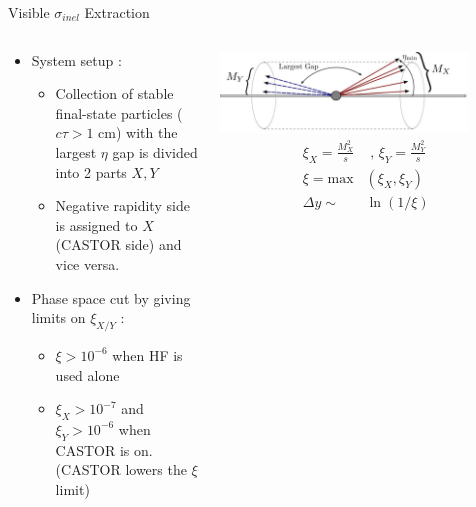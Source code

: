 \documentclass[aspectratio=169,xcolor=dvipsnames]{beamer}
\begin{document}
\begin{frame}{Visible $\sigma_{inel}$ Extraction}
	\begin{columns}[T]
	\begin{column}{0.5\textwidth}
		\begin{itemize}
			\item System setup : 
			\begin{itemize}
				\item Collection of stable final-state particles ($c\tau > 1$ cm) with the largest $\eta$ gap is divided into 2 parts $X,Y$
				\item Negative rapidity side is assigned to $X$ (CASTOR side) and vice versa.
			\end{itemize}\vspace{0.1in}
			\item Phase space cut by giving limits on $\xi_{X/Y}$ :
			\begin{itemize}
				\item $\xi > 10^{-6}$ when HF is used alone
				\item $\xi_X > 10^{-7}$ and $\xi_{Y} > 10^{-6}$ when CASTOR is on. (CASTOR lowers the $\xi$ limit)
			\end{itemize}
		\end{itemize}
	\end{column}
	\begin{column}{.5\textwidth}
		\centering
		\includegraphics[width=0.85\textwidth]{system.png}
		\vspace{0.1in}
		\begin{align*}
		\xi_X = \frac{M^2_X}{s} &\text{ , } \xi_Y = \frac{M^2_Y}{s} \\
		\xi = \text{max}&(\xi_X , \xi_Y) \\
		\Delta y \sim &\ln(1/\xi)
		\end{align*}
	\end{column}
\end{columns}
\end{frame}
\end{document}
